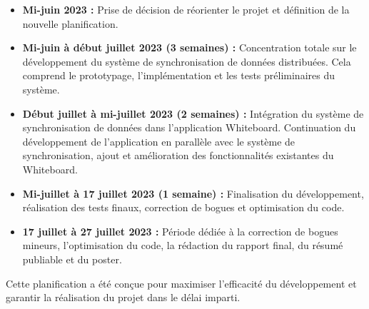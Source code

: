 \begin{itemize}
    \item \textbf{Mi-juin 2023 :} Prise de décision de réorienter le projet et définition de la nouvelle planification.
    \item \textbf{Mi-juin à début juillet 2023 (3 semaines) :} Concentration totale sur le développement du système de synchronisation de données distribuées. Cela comprend le prototypage, l'implémentation et les tests préliminaires du système.
    \item \textbf{Début juillet à mi-juillet 2023 (2 semaines) :} Intégration du système de synchronisation de données dans l'application Whiteboard. Continuation du développement de l'application en parallèle avec le système de synchronisation, ajout et amélioration des fonctionnalités existantes du Whiteboard.
    \item \textbf{Mi-juillet à 17 juillet 2023 (1 semaine) :} Finalisation du développement, réalisation des tests finaux, correction de bogues et optimisation du code.
    \item \textbf{17 juillet à 27 juillet 2023 :} Période dédiée à la correction de bogues mineurs, l'optimisation du code, la rédaction du rapport final, du résumé publiable et du poster.
\end{itemize}

Cette planification a été conçue pour maximiser l'efficacité du développement et garantir la réalisation du projet dans le délai imparti.